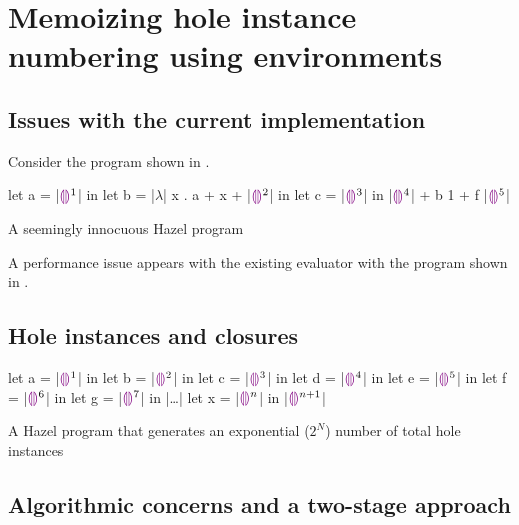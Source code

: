 \section{Memoizing hole instance numbering using environments}
\label{sec:renumbering}

\subsection{Issues with the current implementation}
\label{sec:current_problems}

Consider the program shown in .

\begin{listing}
  \centering
  \begin{hminted}
let a = |$\hehole^1$| in
let b = |$\lambda$| x . { a + x + |$\hehole^2$| } in
let c = |$\hehole^3$| in
|$\hehole^4$| + b 1 + f |$\hehole^5$|
  \end{hminted}
  \caption{A seemingly innocuous Hazel program}
  \label{fig:sample_hazel_program}
\end{listing}

A performance issue appears with the existing evaluator with the program shown in .



\subsection{Hole instances and closures}
\label{sec:hole_instances_and_closures}

\begin{listing}
  \centering
  \begin{hminted}
let a = |$\hehole^1$| in
let b = |$\hehole^2$| in
let c = |$\hehole^3$| in
let d = |$\hehole^4$| in
let e = |$\hehole^5$| in
let f = |$\hehole^6$| in
let g = |$\hehole^7$| in
|\dots|
let x = |$\hehole^{n}$| in
|$\hehole^{n+1}$|
  \end{hminted}
  \caption{A Hazel program that generates an exponential ($2^N$) number of total hole instances}
  \label{fig:hole_renumbering_problem}
\end{listing}

\subsection{Algorithmic concerns and a two-stage approach}
\label{sec:two-stage-renumber}

